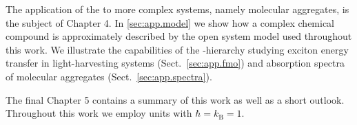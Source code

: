 The application of the \NMSSE to more complex systems, namely molecular aggregates, is the subject of Chapter 4.
In \autoref{sec:app.model} we show how a complex chemical compound is approximately described by the open system model used throughout this work.
We illustrate the capabilities of the \NMSSE-hierarchy studying exciton energy transfer in light-harvesting systems (Sect.~\ref{sec:app.fmo}) and absorption spectra of molecular aggregates (Sect.~\ref{sec:app.spectra}).

The final Chapter 5 contains a summary of this work as well as a short outlook.
Throughout this work we employ units with $\hbar = k_\mathrm{B} = 1$.
